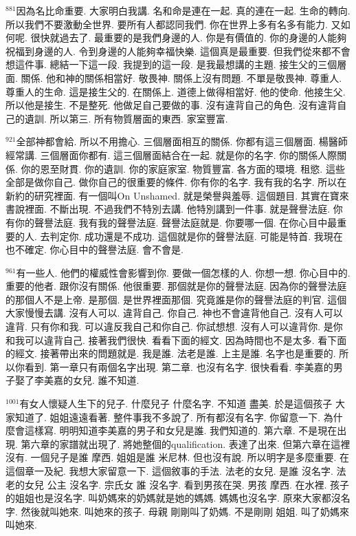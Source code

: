 \documentclass{book}
\begin{document}
$^{881}$因為名比命重要.
大家明白我講.
名和命是連在一起.
真的連在一起.
生命的轉向.
所以我們不要激動全世界.
要所有人都認同我們.
你在世界上多有名多有能力.
又如何呢.
很快就過去了.
最重要的是我們身邊的人.
你是有價值的.
你的身邊的人能夠祝福到身邊的人.
令到身邊的人能夠幸福快樂.
這個真是最重要.
但我們從來都不會想這件事.
總結一下這一段.
我提到的這一段.
是我最想講的主題.
接生父的三個層面.
關係.
他和神的關係相當好.
敬畏神.
關係上沒有問題.
不單是敬畏神.
尊重人.
尊重人的生命.
這是接生父的.
在關係上.
道德上做得相當好.
他的使命.
他接生父.
所以他是接生.
不是整死.
他做足自己要做的事.
沒有違背自己的角色.
沒有違背自己的遺訓.
所以第三.
所有物質層面的東西.
家室豐富.

$^{921}$全部神都會給.
所以不用擔心.
三個層面相互的關係.
你都有這三個層面.
楊醫師經常講.
三個層面你都有.
這三個層面結合在一起.
就是你的名字.
你的關係人際關係.
你的恩至財貫.
你的遺訓.
你的家庭家室.
物質豐富.
各方面的環境.
租慾.
這些全部是做你自己.
做你自己的很重要的條件.
你有你的名字.
我有我的名字.
所以在新約的研究裡面.
有一個叫On Unshamed.
就是榮譽與羞辱.
這個題目.
其實在寶來書說裡面.
不斷出現.
不過我們不特別去講.
他特別講到一件事.
就是聲譽法庭.
你有你的聲譽法庭.
我有我的聲譽法庭.
聲譽法庭就是.
你要哪一個.
在你心目中最重要的人.
去判定你.
成功還是不成功.
這個就是你的聲譽法庭.
可能是特首.
我現在也不確定.
你心目中的聲譽法庭.
會不會是.

$^{961}$有一些人.
他們的權威性會影響到你.
要做一個怎樣的人.
你想一想.
你心目中的.
重要的他者.
跟你沒有關係.
他很重要.
那個就是你的聲譽法庭.
因為你的聲譽法庭的那個人不是上帝.
是那個.
是世界裡面那個.
究竟誰是你的聲譽法庭的判官.
這個大家慢慢去講.
沒有人可以.
違背自己.
你自己.
神也不會違背他自己.
沒有人可以違背.
只有你和我.
可以違反我自己和你自己.
你試想想.
沒有人可以違背你.
是你和我可以違背自己.
接著我們很快.
看看下面的經文.
因為時間也不是太多.
看下面的經文.
接著帶出來的問題就是.
我是誰.
法老是誰.
上主是誰.
名字也是重要的.
所以你看到.
第一章只有兩個名字出現.
第二章.
也沒有名字.
很快看看.
李美嘉的男子娶了李美嘉的女兒.
誰不知道.

$^{1001}$有女人懷疑人生下的兒子.
什麼兒子 什麼名字.
不知道 盡美.
於是這個孩子 大家知道了.
姐姐遠遠看著.
整件事我不多說了.
所有都沒有名字.
你留意一下.
為什麼會這樣寫.
明明知道李美嘉的男子和女兒是誰.
我們知道的.
第六章.
不是現在出現.
第六章的家譜就出現了.
將她整個的qualification.
表達了出來.
但第六章在這裡沒有.
一個兒子是誰 摩西.
姐姐是誰 米尼林.
但也沒有說.
所以明字是多麼重要.
在這個章一及紀.
我想大家留意一下.
這個敘事的手法.
法老的女兒.
是誰 沒名字.
法老的女兒 公主 沒名字.
宗氏女 誰 沒名字.
看到男孩在哭.
男孩 摩西.
在水裡.
孩子的姐姐也是沒名字.
叫奶媽來的奶媽就是她的媽媽.
媽媽也沒名字.
原來大家都沒名字.
然後就叫她來.
叫她來的孩子.
母親 剛剛叫了奶媽.
不是剛剛 姐姐.
叫了奶媽來 叫她來.
\end{document}
